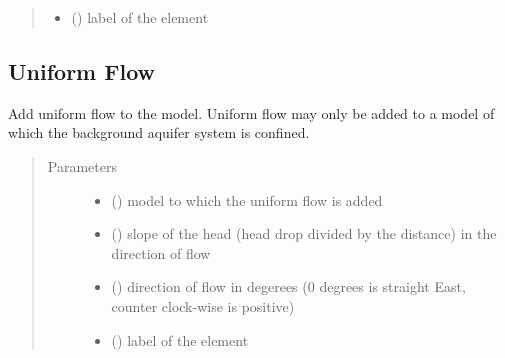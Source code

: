 \documentclass[letterpaper,10pt,english]{sphinxmanual}
\begin{document}
\begin{fulllineitems}
\begin{quote}
\begin{description}
\begin{itemize}
\item {} 
 (\sphinxstyleliteralemphasis{ (}\sphinxstyleliteralemphasis{)}) \textendash{} label of the element

\end{itemize}

\end{description}\end{quote}

\end{fulllineitems}



\subsection{Uniform Flow}
\label{\detokenize{uflow:uniform-flow}}\label{\detokenize{uflow::doc}}

\begin{fulllineitems}
\label{\detokenize{uflow:timml.uflow.Uflow}}
Add uniform flow to the model.
Uniform flow may only be added to a model of which the background
aquifer system is confined.
\begin{quote}\begin{description}
\item[{Parameters}] \leavevmode\begin{itemize}
\item {} 
 () \textendash{} model to which the uniform flow is added

\item {} 
 () \textendash{} slope of the head (head drop divided by the distance) in the
direction of flow

\item {} 
 () \textendash{} direction of flow in degerees (0 degrees is straight East,
counter clock-wise is positive)

\item {} 
 (\sphinxstyleliteralemphasis{ (}\sphinxstyleliteralemphasis{)}) \textendash{} label of the element

\end{itemize}

\end{description}\end{quote}

\end{fulllineitems}
\end{document}
